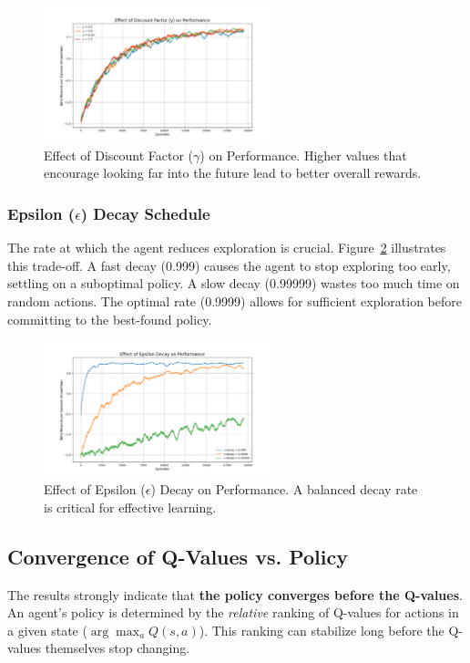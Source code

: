 \documentclass{article}
\begin{document}
\begin{figure}[H]
    \centering
    \includegraphics[width=0.6\textwidth]{../results/discount_factor_episodes.png}
    \caption{Effect of Discount Factor ($\gamma$) on Performance. Higher values that encourage looking far into the future lead to better overall rewards.}
    \label{fig:discount_factor}
\end{figure}


\subsubsection{Epsilon ($\epsilon$) Decay Schedule}
The rate at which the agent reduces exploration is crucial. Figure~\ref{fig:epsilon_decay} illustrates this trade-off. A fast decay (0.999) causes the agent to stop exploring too early, settling on a suboptimal policy. A slow decay (0.99999) wastes too much time on random actions. The optimal rate (0.9999) allows for sufficient exploration before committing to the best-found policy.

\begin{figure}[H]
    \centering
    \includegraphics[width=0.6\textwidth]{../results/epsilon_decay.png}
    \caption{Effect of Epsilon ($\epsilon$) Decay on Performance. A balanced decay rate is critical for effective learning.}
    \label{fig:epsilon_decay}
\end{figure}

\subsection{Convergence of Q-Values vs. Policy}
The results strongly indicate that \textbf{the policy converges before the Q-values}. An agent's policy is determined by the \textit{relative} ranking of Q-values for actions in a given state ($\arg\max_a Q(s, a)$). This ranking can stabilize long before the Q-values themselves stop changing.
\end{document}

